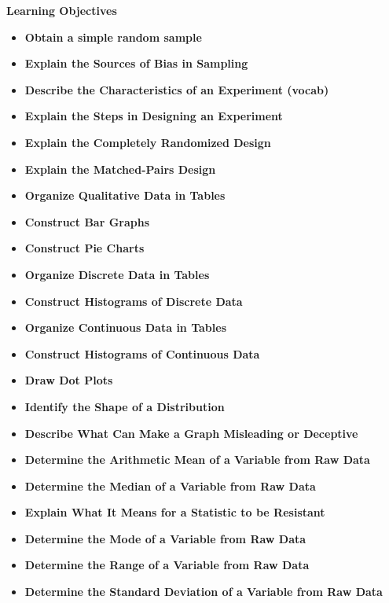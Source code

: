 \documentclass{report}
\begin{document}
        \pagebreak \bigbreak \noindent
        \begin{large}
          \textbf{Learning Objectives}
        \end{large}
        \bigbreak \noindent 
        \begin{itemize}
        \item \textbf{Obtain a simple random sample}
            \item \textbf{Explain the Sources of Bias in Sampling}
            \item \textbf{Describe the Characteristics of an Experiment (vocab)}
            \item \textbf{Explain the Steps in Designing an Experiment}
            \item \textbf{Explain the Completely Randomized Design}
            \item \textbf{Explain the Matched-Pairs Design}
            \item \textbf{Organize Qualitative Data in Tables}
            \item \textbf{Construct Bar Graphs}
            \item \textbf{Construct Pie Charts}
            \item \textbf{Organize Discrete Data in Tables}
            \item \textbf{Construct Histograms of Discrete Data}
            \item \textbf{Organize Continuous Data in Tables}
            \item \textbf{Construct Histograms of Continuous Data}
            \item \textbf{Draw Dot Plots}
            \item \textbf{Identify the Shape of a Distribution}
            \item \textbf{Describe What Can Make a Graph Misleading or Deceptive}
            \item \textbf{Determine the Arithmetic Mean of a Variable from Raw Data}
            \item \textbf{Determine the Median of a Variable from Raw Data}
            \item \textbf{Explain What It Means for a Statistic to be Resistant}
            \item \textbf{Determine the Mode of a Variable from Raw Data}
            \item \textbf{Determine the Range of a Variable from Raw Data}
            \item \textbf{Determine the Standard Deviation of a Variable from Raw Data}

\end{itemize}
\end{document}
